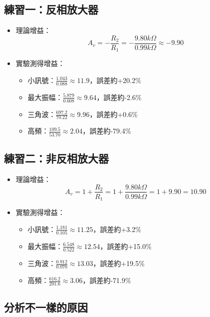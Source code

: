 \documentclass[12pt,a4paper]{article}
\begin{document}
\begin{CJK}{UTF8}{bkai}
\subsection{練習一：反相放大器}
\begin{itemize}
    \item 理論增益：
    \begin{equation}
        A_v=-\frac{R_2}{R_1}=-\frac{9.80k\Omega}{0.99k\Omega}\approx -9.90
        \nonumber
    \end{equation}
    \item 實驗測得增益：
    \begin{itemize}
        \item 小訊號：$\frac{1.043}{0.088} \approx 11.9$，誤差約+20.2\%
        \item 最大振幅：$\frac{5.879}{0.608} \approx 9.64$，誤差約-2.6\%
        \item 三角波：$\frac{697.2}{70.22} \approx 9.96$，誤差約+0.6\%
        \item 高頻：$\frac{109.5}{53.70} \approx 2.04$，誤差約-79.4\%
    \end{itemize}
\end{itemize}

\subsection{練習二：非反相放大器}
\begin{itemize}
    \item 理論增益：
    \begin{equation}
        A_v=1+\frac{R_2}{R_1}=1+\frac{9.80k\Omega}{0.99k\Omega}=1+9.90=10.90
        \nonumber
    \end{equation}
    \item 實驗測得增益：
    \begin{itemize}
        \item 小訊號：$\frac{1.181}{0.105} \approx 11.25$，誤差約+3.2\%
        \item 最大振幅：$\frac{6.548}{0.522} \approx 12.54$，誤差約+15.0\%
        \item 三角波：$\frac{0.912}{0.070} \approx 13.03$，誤差約+19.5\%
        \item 高頻：$\frac{616.2}{201.6} \approx 3.06$，誤差約-71.9\%
    \end{itemize}
\end{itemize}

\subsection{分析不一樣的原因}
\hfill


\end{CJK}
\end{document}
